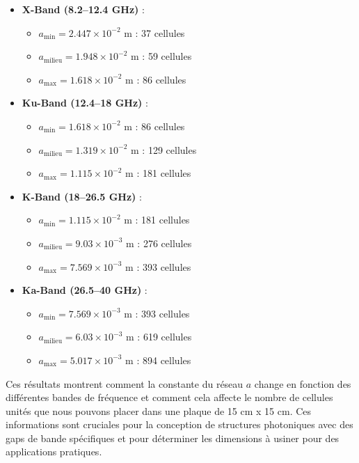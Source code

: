 \documentclass{article}
\begin{document}
\begin{itemize}
    \item \textbf{X-Band (8.2–12.4 GHz)} :
    \begin{itemize}
        \item \( a_{\text{min}} = 2.447 \times 10^{-2} \) m : 37 cellules
        \item \( a_{\text{milieu}} = 1.948 \times 10^{-2} \) m : 59 cellules
        \item \( a_{\text{max}} = 1.618 \times 10^{-2} \) m : 86 cellules
    \end{itemize}
    \item \textbf{Ku-Band (12.4–18 GHz)} :
    \begin{itemize}
        \item \( a_{\text{min}} = 1.618 \times 10^{-2} \) m : 86 cellules
        \item \( a_{\text{milieu}} = 1.319 \times 10^{-2} \) m : 129 cellules
        \item \( a_{\text{max}} = 1.115 \times 10^{-2} \) m : 181 cellules
    \end{itemize}
    \item \textbf{K-Band (18–26.5 GHz)} :
    \begin{itemize}
        \item \( a_{\text{min}} = 1.115 \times 10^{-2} \) m : 181 cellules
        \item \( a_{\text{milieu}} = 9.03 \times 10^{-3} \) m : 276 cellules
        \item \( a_{\text{max}} = 7.569 \times 10^{-3} \) m : 393 cellules
    \end{itemize}
    \item \textbf{Ka-Band (26.5–40 GHz)} :
    \begin{itemize}
        \item \( a_{\text{min}} = 7.569 \times 10^{-3} \) m : 393 cellules
        \item \( a_{\text{milieu}} = 6.03 \times 10^{-3} \) m : 619 cellules
        \item \( a_{\text{max}} = 5.017 \times 10^{-3} \) m : 894 cellules
    \end{itemize}
\end{itemize}

Ces résultats montrent comment la constante du réseau \( a \) change en fonction des différentes bandes de fréquence et comment cela affecte le nombre de cellules unités que nous pouvons placer dans une plaque de 15 cm x 15 cm. Ces informations sont cruciales pour la conception de structures photoniques avec des gaps de bande spécifiques et pour déterminer les dimensions à usiner pour des applications pratiques.
\end{document}
